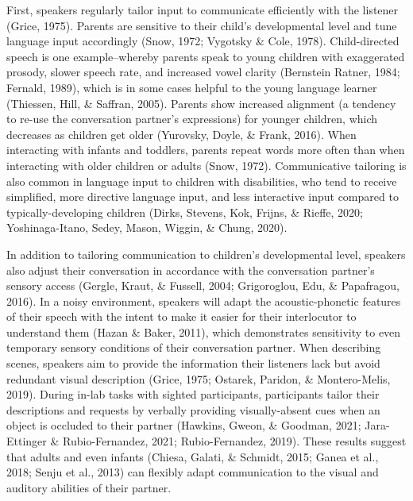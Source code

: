 \documentclass[
  man,floatsintext]{apa6}
\begin{document}
First, speakers regularly tailor input to communicate efficiently with the listener (Grice, 1975). Parents are sensitive to their child's developmental level and tune language input accordingly (Snow, 1972; Vygotsky \& Cole, 1978). Child-directed speech is one example--whereby parents speak to young children with exaggerated prosody, slower speech rate, and increased vowel clarity (Bernstein Ratner, 1984; Fernald, 1989), which is in some cases helpful to the young language learner (Thiessen, Hill, \& Saffran, 2005). Parents show increased alignment (a tendency to re-use the conversation partner's expressions) for younger children, which decreases as children get older (Yurovsky, Doyle, \& Frank, 2016). When interacting with infants and toddlers, parents repeat words more often than when interacting with older children or adults (Snow, 1972). Communicative tailoring is also common in language input to children with disabilities, who tend to receive simplified, more directive language input, and less interactive input compared to typically-developing children (Dirks, Stevens, Kok, Frijns, \& Rieffe, 2020; Yoshinaga-Itano, Sedey, Mason, Wiggin, \& Chung, 2020).

In addition to tailoring communication to children's developmental level, speakers also adjust their conversation in accordance with the conversation partner's sensory access (Gergle, Kraut, \& Fussell, 2004; Grigoroglou, Edu, \& Papafragou, 2016). In a noisy environment, speakers will adapt the acoustic-phonetic features of their speech with the intent to make it easier for their interlocutor to understand them (Hazan \& Baker, 2011), which demonstrates sensitivity to even temporary sensory conditions of their conversation partner. When describing scenes, speakers aim to provide the information their listeners lack but avoid redundant visual description (Grice, 1975; Ostarek, Paridon, \& Montero-Melis, 2019). During in-lab tasks with sighted participants, participants tailor their descriptions and requests by verbally providing visually-absent cues when an object is occluded to their partner (Hawkins, Gweon, \& Goodman, 2021; Jara-Ettinger \& Rubio-Fernandez, 2021; Rubio-Fernandez, 2019). These results suggest that adults and even infants (Chiesa, Galati, \& Schmidt, 2015; Ganea et al., 2018; Senju et al., 2013) can flexibly adapt communication to the visual and auditory abilities of their partner.
\end{document}
